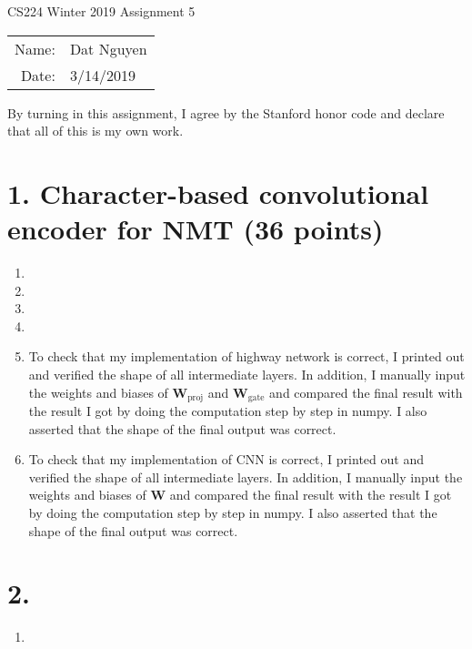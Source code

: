 \documentclass[12pt]{article}
\begin{document}
\begin{center}
{\Large CS224 Winter 2019 Assignment 5}

\begin{tabular}{rl}
Name: & Dat Nguyen \\
Date: & 3/14/2019 \\
\end{tabular}
\end{center}

By turning in this assignment, I agree by the Stanford honor code and declare
that all of this is my own work.

\section*{1. Character-based convolutional encoder for NMT (36 points)}
\begin{enumerate}[label=(\alph*)]
  \item
  \item
  \item
  \item
  \addtocounter{enumi}{3}
  \item To check that my implementation of highway network is correct, I printed out and verified the shape of all intermediate layers. In addition, I manually input the weights and biases of $\mathbf{W}_{\text{proj}}$ and $\mathbf{W}_{\text{gate}}$ and compared the final result with the result I got by doing the computation step by step in numpy. I also asserted that the shape of the final output was correct.
  \item
  To check that my implementation of CNN is correct, I printed out and verified the shape of all intermediate layers. In addition, I manually input the weights and biases of $\mathbf{W}$ and compared the final result with the result I got by doing the computation step by step in numpy. I also asserted that the shape of the final output was correct.
\end{enumerate}

\section*{2.}
\begin{enumerate}[label=(\alph*)]
  \addtocounter{enumi}{6}
  \item
\end{enumerate}
\end{document}
